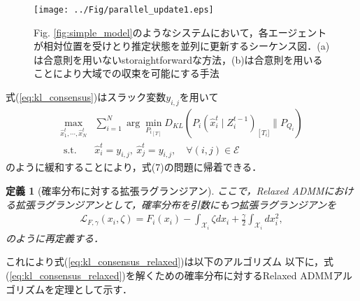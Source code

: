 \documentclass[a4paper,fleqn,10pt]{paper_template}
\newtheorem{definition}{定義}
\begin{document}
\begin{figure}[t]
	\begin{center}
		\texttt{[image: ../Fig/parallel\_update1.eps]}
		\caption{Fig. \ref{fig:simple_model}のようなシステムにおいて，各エージェントが相対位置を受けとり推定状態を並列に更新するシーケンス図．(a)は合意則を用いないstoraightforwardな方法，(b)は合意則を用いることにより大域での収束を可能にする手法}
		\label{fig:parallel_update}
	\end{center}
	\vspace{-2mm}
\end{figure}

式(\ref{eq:kl_consensus})はスラック変数$y_{i,j}$を用いて
\begin{equation}
\begin{aligned}
\max _{\hat x_{1}^{t}, \cdots, \hat x_{N}^{t}} & \sum_{i=1}^{N} \arg \min _{{P_{i}}_{[T]}} D_{K L}\left(P_{i}\left(\hat x_{i}^{t} \mid Z_{i}^{t-1}\right)_{\left[T_{i}]\right.} \| P_{Q_{i}} \right) \\
\text { s.t. } & \hat x_{i}^{t}=y_{i,j}, \:\hat x_{j}^{t}=y_{i,j}, \quad\forall(i, j) \in \mathcal{E}
\label{eq:kl_consensus_relaxed}
\end{aligned}
\end{equation}
のように緩和することにより，式(7)の問題に帰着できる．

\begin{definition}[確率分布に対する拡張ラグランジアン]
ここで，Relaxed ADMMにおける拡張ラグランジアンとして，確率分布を引数にもつ拡張ラグランジアンを
\begin{equation}
\begin{aligned}
 {\mathcal{ L}}_{F,\gamma}(x_i, \zeta) 
 = F_i(x_i) - \int_{{\mathcal{X}}_i}
\zeta dx_i + \frac{\gamma}{2}\int_{{\mathcal{X}}_i} dx_i^2,
\label{eq:relaxed_lagrangian}
\end{aligned}
\end{equation}
のように再定義する．
\end{definition}

これにより式(\ref{eq:kl_consensus_relaxed})は以下のアルゴリズム
以下に，式(\ref{eq:kl_consensus_relaxed})を解くための確率分布に対するRelaxed ADMMアルゴリズムを定理として示す．
\end{document}
